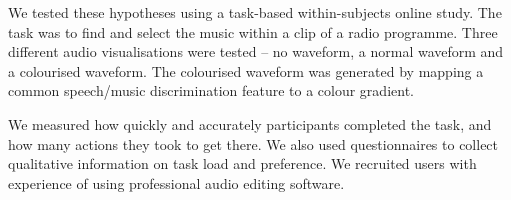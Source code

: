 
We tested these hypotheses using a task-based within-subjects online study. The task was to find and select the music
within a clip of a radio programme. Three different audio visualisations were tested -- no waveform, a normal waveform
and a colourised waveform. The colourised waveform was generated by mapping a common speech/music discrimination
feature to a colour gradient.

We measured how quickly and accurately participants completed the task, and how many actions they took to get there. We
also used questionnaires to collect qualitative information on task load and preference.
We recruited users with experience of using professional audio editing software.



